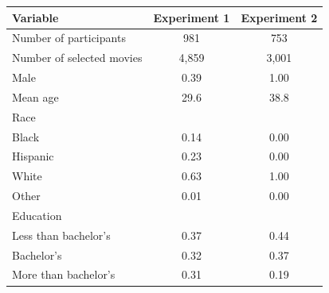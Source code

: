 \documentclass[12pt,letterpaper]{article}
\begin{document}
\begin{center}
\begin{tabular}{||l c c||} 
 \hline
 Variable & Experiment 1 & Experiment 2\\ [0.5ex] 
 \hline\hline
Number of participants & 981 & 753\\ 
 \hline
 Number of selected movies & 4,859 & 3,001 \\
 \hline
 Male & 0.39 & 1.00 \\
 \hline
 Mean age & 29.6 & 38.8 \\  
 \hline

 Race &  &  \\
 \hline
 \hspace{1cm} Black & 0.14 & 0.00 \\
 \hline
 \hspace{1cm} Hispanic & 0.23 & 0.00 \\
 \hline
 \hspace{1cm} White & 0.63 & 1.00 \\
 \hline
 \hspace{1cm} Other & 0.01 & 0.00 \\
 \hline
 Education &  &  \\
 \hline
 \hspace{1cm} Less than bachelor's & 0.37 & 0.44 \\
 \hline
 \hspace{1cm} Bachelor's & 0.32 & 0.37 \\
 \hline
 \hspace{1cm} More than bachelor's & 0.31 & 0.19 \\
 \hline
\end{tabular}
\end{center}
\end{document}
